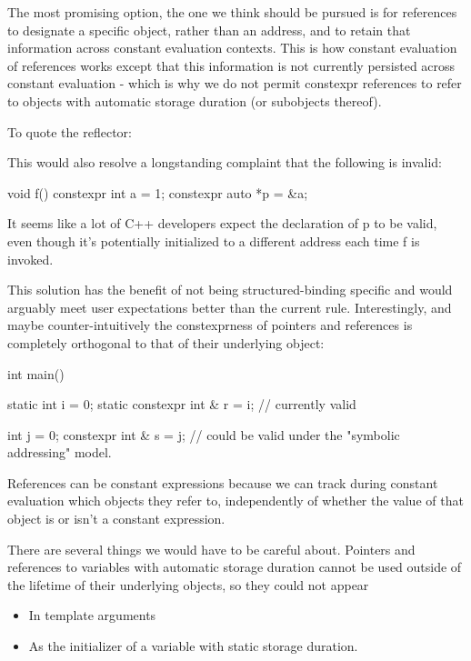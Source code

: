 \documentclass{wg21}
\begin{document}
The most promising option, the one we think should be pursued is for  references to designate a specific object, rather than an address,
and to retain that information across constant evaluation contexts.
This is how constant evaluation of references works except that this information is not currently persisted across constant evaluation - which is why we do not permit
constexpr references to refer to objects with automatic storage duration (or subobjects thereof).

To quote the reflector:

\begin{quoteblock}
This would also resolve a longstanding complaint that the following is invalid:
\begin{colorblock}
void f() {
    constexpr int a = 1;
    constexpr auto *p = &a;
}
\end{colorblock}

It seems like a lot of C++ developers expect the declaration of p to be valid, even though it's potentially initialized to a different address each time f is invoked.
\end{quoteblock}

This solution has the benefit of not being structured-binding specific and would arguably meet user expectations better than the current rule.
Interestingly, and maybe counter-intuitively  the constexprness of pointers and references is completely orthogonal to that of their underlying object:

\begin{colorblock}
int main() {
    static int i = 0;
    static constexpr int & r = i; // currently valid

    int j = 0;
    constexpr int & s = j; // could be valid under the "symbolic addressing" model.
}
\end{colorblock}

References can be constant expressions because we can track during constant evaluation which objects they refer to, independently of whether the value of that object is or isn't a constant expression.

There are several things we would have to be careful about.
Pointers and references to variables with automatic storage duration cannot be used outside of the lifetime of their underlying objects, so they could not appear
\begin{itemize}
  \item In template arguments
  \item As the initializer of a variable with static storage duration.
\end{itemize}
\end{document}
